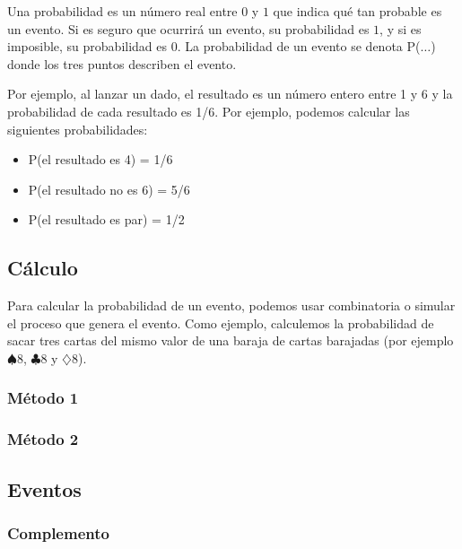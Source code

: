 Una probabilidad es un número real entre $0$ y $1$ que indica qué tan probable es un evento. Si es seguro que ocurrirá un evento, su probabilidad es $1$, y si es imposible, su probabilidad es $0$. La probabilidad de un evento se denota P($\dots$) donde los tres puntos describen el evento.

Por ejemplo, al lanzar un dado, el resultado es un número entero entre 1 y 6 y la probabilidad de cada resultado es 1/6. Por ejemplo, podemos calcular las siguientes probabilidades:

\begin{itemize}
	\item P(el resultado es 4) = 1/6
	\item P(el resultado no es 6) = 5/6
	\item P(el resultado es par) = 1/2
\end{itemize}

\subsection{Cálculo}

Para calcular la probabilidad de un evento, podemos usar combinatoria o simular el proceso que genera el evento. Como ejemplo, calculemos la probabilidad de sacar tres cartas del mismo valor de una baraja de cartas barajadas (por ejemplo $\spadesuit$8, $\clubsuit$8 y $\diamondsuit$8).

\subsubsection{Método 1}


\subsubsection{Método 2}


\subsection{Eventos}


\subsubsection{Complemento}


